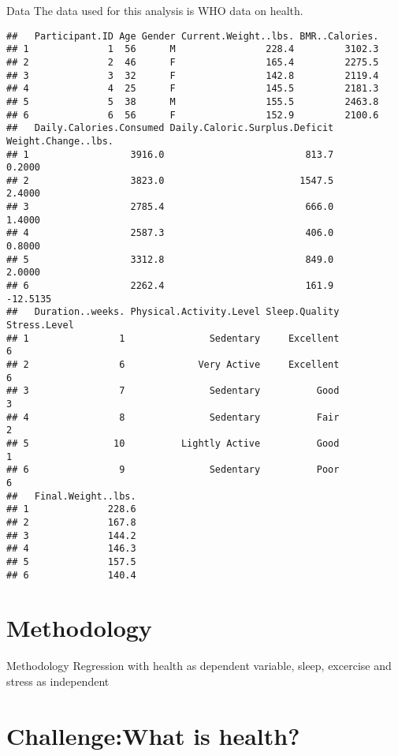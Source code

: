 \documentclass[
  11pt,
  ignorenonframetext,
]{elsarticle}
\begin{document}
\begin{frame}[fragile]{Data}
The data used for this analysis is WHO data on health.

\begin{verbatim}
##   Participant.ID Age Gender Current.Weight..lbs. BMR..Calories.
## 1              1  56      M                228.4         3102.3
## 2              2  46      F                165.4         2275.5
## 3              3  32      F                142.8         2119.4
## 4              4  25      F                145.5         2181.3
## 5              5  38      M                155.5         2463.8
## 6              6  56      F                152.9         2100.6
##   Daily.Calories.Consumed Daily.Caloric.Surplus.Deficit Weight.Change..lbs.
## 1                  3916.0                         813.7              0.2000
## 2                  3823.0                        1547.5              2.4000
## 3                  2785.4                         666.0              1.4000
## 4                  2587.3                         406.0              0.8000
## 5                  3312.8                         849.0              2.0000
## 6                  2262.4                         161.9            -12.5135
##   Duration..weeks. Physical.Activity.Level Sleep.Quality Stress.Level
## 1                1               Sedentary     Excellent            6
## 2                6             Very Active     Excellent            6
## 3                7               Sedentary          Good            3
## 4                8               Sedentary          Fair            2
## 5               10          Lightly Active          Good            1
## 6                9               Sedentary          Poor            6
##   Final.Weight..lbs.
## 1              228.6
## 2              167.8
## 3              144.2
## 4              146.3
## 5              157.5
## 6              140.4
\end{verbatim}
\end{frame}

\section{Methodology}\label{methodology}

\begin{frame}{Methodology}
Regression with health as dependent variable, sleep, excercise and
stress as independent
\end{frame}

\section{Challenge:What is health?}\label{challengewhat-is-health}
\end{document}
